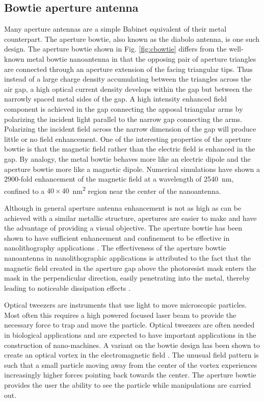 \documentclass[11pt]{article}
\begin{document}
\subsection{Bowtie aperture antenna}
%
Many aperture antennas are a simple Babinet equivalent of their metal counterpart. The aperture bowtie, also known as the diabolo antenna, is one such design. The aperture bowtie shown in Fig. \ref{fig:cbowtie} differs from the well-known metal bowtie nanoantenna in that the opposing pair of aperture triangles are connected through an aperture extension of the facing triangular tips. Thus instead of a large charge density accumulating between the triangles across the air gap, a high optical current density develops within the gap but between the narrowly spaced metal sides of the gap.  A high intensity enhanced field component is achieved in the gap connecting the apposal triangular arms by polarizing the incident light parallel to the narrow gap connecting the arms. Polarizing the incident field across the narrow dimension of the gap will produce little or no field enhancement.  One of the interesting properties of the aperture bowtie is that the magnetic field rather than the electric field is enhanced in the gap. By analogy, the metal bowtie behaves more like an electric dipole and the aperture bowtie more like a magnetic dipole. Numerical
simulations have shown a $2900$-fold enhancement of the magnetic field at a wavelength of \SI{2540}{\nano\metre}, confined to a $40\times40$\SI{}{\nano\metre^2} region near the center of the nanoantenna.

Although in general aperture antenna enhancement is not as high as can be achieved with a similar metallic structure, apertures are easier to make and have the advantage of providing a visual objective. The aperture bowtie has been shown to have sufficient enhancement and confinement to be effective in nanolithography applications \cite{Wang2006}. The effectiveness of the aperture bowtie nanoantenna in nanolithographic applications is attributed to the fact that the magnetic field created in the aperture gap above the photoresist mask enters the mask in the perpendicular direction, easily penetrating into the metal, thereby leading to noticeable dissipation effects \cite{Grosjean2011}.

Optical tweezers are instruments that use light to move microscopic particles. Most often this requires a high powered focused laser beam to provide the necessary force to trap and move the particle. Optical tweezers are often needed in biological applications and are expected to have important applications in the construction of nano-machines. A variant on the bowtie design has been shown to create an optical vortex in the electromagnetic field \cite{Kang2011}. The unusual field pattern is such that a small particle moving away from the center of the vortex experiences increasingly higher forces pointing back towards the center. The aperture bowtie provides the user the ability to see the particle while manipulations are carried out.
\end{document}
